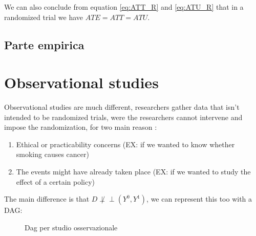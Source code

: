 We can also conclude from equation \ref{eq:ATT_R} and \ref{eq:ATU_R} that in a randomized trial we have $ATE = ATT = ATU$.
\subsection{Parte empirica}

\section{Observational studies} %
Observational studies are much different, researchers gather data that isn't intended to be randomized trials, were the researchers cannot intervene and impose the randomization, for two main reason :
\begin{enumerate}
\item Ethical or practicability concerns  (EX: if we wanted to know whether smoking causes cancer)
\item The events might have already taken place  (EX: if we wanted to study the effect of a certain policy)
\end{enumerate}

The main difference is that $D \not \perp\!\!\!\perp (Y^{0},Y^{1})$, we can represent this too with a DAG:
\begin{figure}[!h]
\centering
\caption{Dag per studio osservazionale}
\label{fig:dag_OBS}
\end{figure}